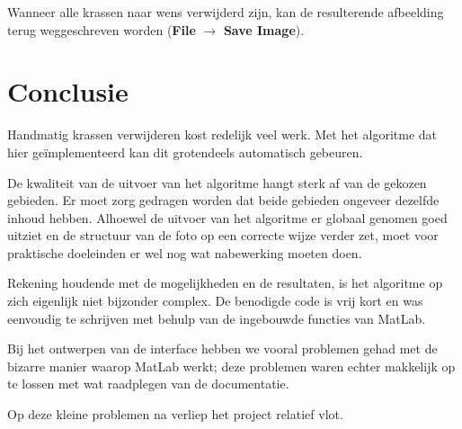 \documentclass[a4paper,14pt]{extarticle}
\begin{document}
Wanneer alle krassen naar wens verwijderd zijn, kan de resulterende afbeelding
terug weggeschreven worden (\textbf{File} $\to$ \textbf{Save Image}).

\section{Conclusie}

Handmatig krassen verwijderen kost redelijk veel werk. Met het algoritme dat
hier ge\"implementeerd kan dit grotendeels automatisch gebeuren. 

De kwaliteit van de uitvoer van het algoritme hangt sterk af van de gekozen
gebieden. Er moet zorg gedragen worden dat beide gebieden ongeveer dezelfde
inhoud hebben. Alhoewel de uitvoer van het algoritme er globaal genomen goed
uitziet en de structuur van de foto op een correcte wijze verder zet, moet voor
praktische doeleinden er wel nog wat nabewerking moeten doen.

Rekening houdende met de mogelijkheden en de resultaten, is het algoritme op
zich eigenlijk niet bijzonder complex. De benodigde code is vrij kort en was
eenvoudig te schrijven met behulp van de ingebouwde functies van MatLab.

Bij het ontwerpen van de interface hebben we vooral problemen gehad met de
bizarre manier waarop MatLab werkt; deze problemen waren echter makkelijk op te
lossen met wat raadplegen van de documentatie.

Op deze kleine problemen na verliep het project relatief vlot.
\end{document}
